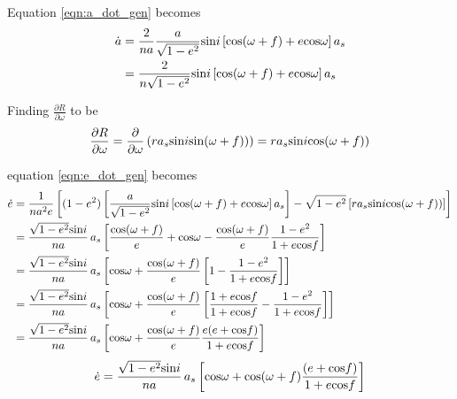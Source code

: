 \documentclass[]{aiaa-tc}%
\begin{document}
Equation \ref{eqn:a_dot_gen} becomes
\begin{equation}
\begin{aligned} 
\dot{a} &= \frac{2}{na}\frac{a}{\sqrt{1-e^2}}\textup{sin}i \left [ \textup{cos}(\omega +f )+e\textup{cos}\omega \right ]a_s \\
 &=\frac{2}{n\sqrt{1-e^2}}\textup{sin}i \left [ \textup{cos}(\omega +f )+e\textup{cos}\omega \right ]a_s
\end{aligned}
	\end{equation}

Finding $\frac{\partial R}{\partial \omega}$ to be
	\begin{equation}
\frac{\partial R}{\partial \omega}=\frac{\partial }{\partial \omega}\left ( ra_s\textup{sin}i\textup{sin}(\omega+f)) \right )=ra_s\textup{sin}i\textup{cos}(\omega+f))
	\label{eqn:a_dot} 
	\end{equation}

equation \ref{eqn:e_dot_gen} becomes
	\begin{equation}
\begin{aligned} 
\dot{e} &= \frac{1}{na^2e}\left [ (1-e^2) \left [\frac{a}{\sqrt{1-e^2}}\textup{sin}i \left [ \textup{cos}(\omega +f )+e\textup{cos}\omega \right ]a_s\right ]  - \sqrt{1-e^2}\left [ra_s\textup{sin}i\textup{cos}(\omega+f))  \right ] \right] \\
 &= \frac{\sqrt{1-e^2}\textup{sin}i}{na}\, a_s\left [ \frac{\textup{cos}(\omega +f )}{e} +\textup{cos}\omega -\frac{\textup{cos}(\omega +f )}{e}\frac{1-e^2}{1+e\textup{cos}f}\right ] \\
 &= \frac{\sqrt{1-e^2}\textup{sin}i}{na}\, a_s\left [ \textup{cos}\omega +\frac{\textup{cos}(\omega +f )}{e}\left [1-\frac{1-e^2}{1+e\textup{cos}f}  \right ]\right ] \\
 &= \frac{\sqrt{1-e^2}\textup{sin}i}{na}\, a_s\left [ \textup{cos}\omega +\frac{\textup{cos}(\omega +f )}{e}\left [\frac{1+e\textup{cos}f}{1+e\textup{cos}f}-\frac{1-e^2}{1+e\textup{cos}f}  \right ]\right ] \\
 &= \frac{\sqrt{1-e^2}\textup{sin}i}{na}\, a_s\left [ \textup{cos}\omega +\frac{\textup{cos}(\omega +f )}{e}\frac{e(e+\textup{cos}f)}{1+e\textup{cos}f}\right ] \\
\end{aligned}
	\end{equation}
	\begin{equation}
\dot{e}= \frac{\sqrt{1-e^2}\textup{sin}i}{na}\, a_s\left [ \textup{cos}\omega +\textup{cos}(\omega +f )\frac{(e+\textup{cos}f)}{1+e\textup{cos}f}\right ]  
	\label{eqn:e_dot} 
	\end{equation}
\end{document}
